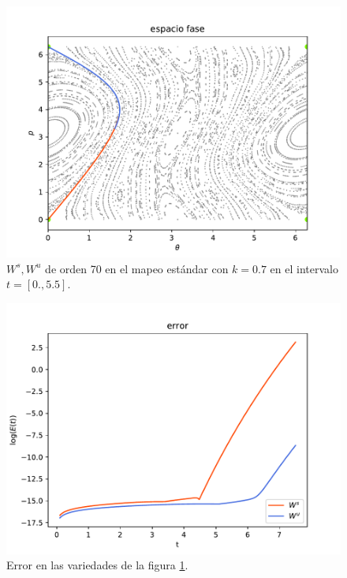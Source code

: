 \begin{figure}[H]
\centering
\includegraphics[scale=0.7]{k07}
\caption{$W^{s},W^{u}$ de orden 70 en el mapeo estándar con $k=0.7$ en el intervalo $t=[0.,5.5]$.}
\label{estandar07}
\end{figure}

\begin{figure}[H]
\centering
\includegraphics[scale=0.7]{errork07} 
\caption{Error en las variedades de la figura \ref{estandar07}.}
\label{error est k07}
\end{figure}


